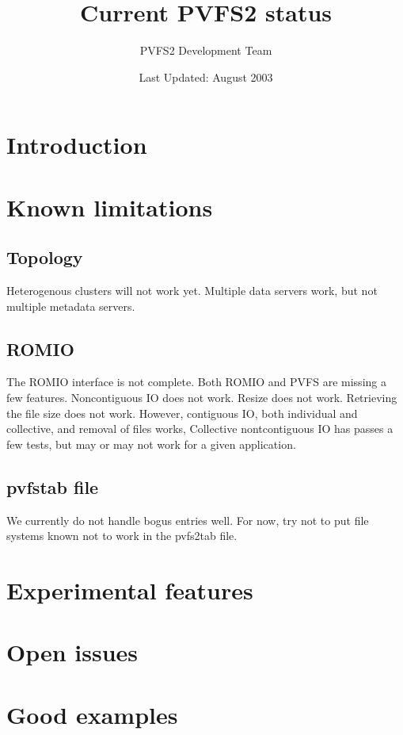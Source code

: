 \documentclass[11pt, letterpaper]{article}
\title{Current PVFS2 status}
\author{ PVFS2 Development Team }
\date{ Last Updated: August 2003 }
\begin{document}
\maketitle

\tableofcontents

\newpage

\thispagestyle{empty}

\setlength{\parindent}{0.0cm}

\section{Introduction}
\section{Known limitations}
\subsection{Topology}

Heterogenous clusters will not work yet.  Multiple data servers work, but not
multiple metadata servers.

\subsection{ROMIO}

The ROMIO interface is not complete.  Both ROMIO and PVFS are missing a few
features.  Noncontiguous IO does not work.   Resize does not work.   Retrieving
the file size does not work.  However, contiguous IO, both individual and
collective, and removal of files works,   Collective nontcontiguous IO has
passes a few tests, but may or may not work for a given application.  

\subsection{pvfstab file}
We currently do not handle bogus entries well.  For now, try not to put file
systems known not to work in the pvfs2tab file.

\section{Experimental features}
\section{Open issues}
\section{Good examples}
\end{document}
